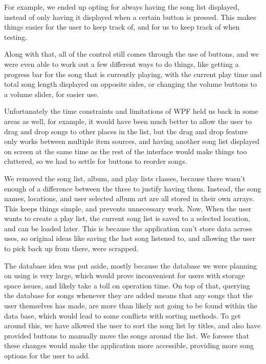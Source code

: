 \documentclass[10pt,conference,onecolumn,compsoc]{IEEEtran}
\begin{document}
For example, we ended up opting for always having the song list displayed, instead of only having it displayed when a certain button is pressed. This makes things easier for the user to keep track of, and for us to keep track of when testing.

Along with that, all of the control still comes through the use of buttons, and we were even able to work out a few different ways to do things, like getting a progress bar for the song that is currently playing, with the current play time and total song length displayed on opposite sides, or changing the volume buttons to a volume slider, for easier use. 

Unfortunately the time constraints and limitations of WPF held us back in some areas as well, for example, it would have been much better to allow the user to drag and drop songs to other places in the list, but the drag and drop feature only works between multiple item sources, and having another song list displayed on screen at the same time as the rest of the interface would make things too cluttered, so we had to settle for buttons to reorder songs. 

We removed the song list, album, and play lists classes, because there wasn't enough of a difference between the three to justify having them. Instead, the song names, locations, and user selected album art are all stored in their own arrays. This keeps things simple, and prevents unnecessary work. Now, When the user wants to create a play list, the current song list is saved to a selected location, and can be loaded later. This is because the application can't store data across uses, so original ideas like saving the last song listened to, and allowing the user to pick back up from there, were scrapped. 

The database idea was put aside, mostly because the database we were planning on using is very large, which would prove inconvenient for users with storage space issues, and likely take a toll on operation time. On top of that, querying the database for songs whenever they are added means that any songs that the user themselves has made, are more than likely not going to be found within the data base, which would lead to some conflicts with sorting methods. To get around this, we have allowed the user to sort the song list by titles, and also have provided buttons to manually move the songs around the list. We foresee that these changes would make the application more accessible, providing more song options for the user to add.
\end{document}
